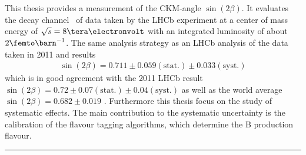 \section*{\abstractname}
This thesis provides a measurement of the CKM-angle $\sin(2\beta)$. It evaluates the decay channel \Decaychannel\ of data taken by the LHCb experiment at a center of mass energy of $\sqrt{s}=8\tera\electronvolt$ with an integrated luminosity of about $2\femto\barn^{-1}$. The same analysis strategy as an LHCb analysis of the data taken in 2011 \cite{lhcb-paper} and results
\begin{align*}
\sin(2\beta) = 0.711 \pm 0.059(\text{stat.}) \pm 0.033(\text{syst.})
\end{align*}
which is in good agreement with the 2011 LHCb result $\sin(2\beta) = 0.72 \pm 0.07 (\text{stat.}) \pm 0.04 (\text{syst.})$ \cite{lhcb-paper} as well as the world average $\sin(2\beta) = 0.682 \pm 0.019$ \cite{pdg-average}. Furthermore this thesis focus on the study of systematic effects. The main contribution to the systematic uncertainty is the calibration of the flavour tagging algorithms, which determine the B production flavour. \\ \hrule





